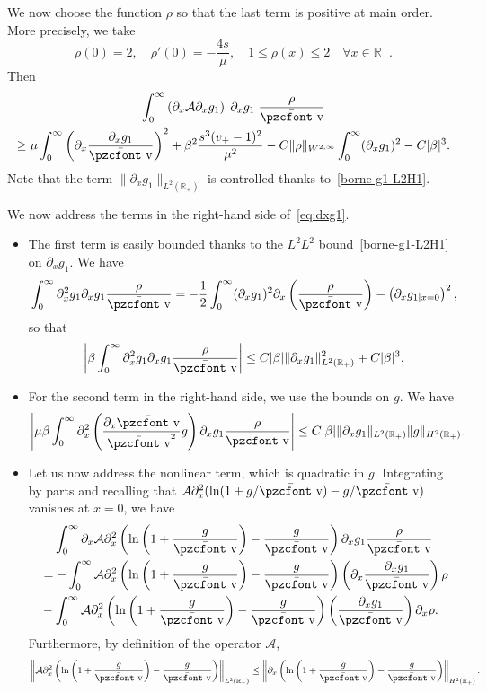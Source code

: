 \documentclass[10pt]{amsart}
\theoremstyle{definition}\newtheorem{defi}[theo]{Definition}\newtheorem{rema}[theo]{Remark}\newtheorem{exam}[theo]{Example}\newtheorem{exem}[theo]{Example}\newtheorem{nota}[theo]{Notation}
\newcommand{\mathpzc}[1]{\text{\pzcfont #1}}
\newcommand{\R}{\mathbb{R}}
\newcommand{\p}{\partial}
\newcommand{\bv}{\bar{\mathpzc{v}}}
\newcommand{\cA}{\mathcal A}
\let\oldforall\forall
\renewcommand*{\forall}{\mathrel{\oldforall}}
\begin{document}
We now choose the function $\rho$ so that the last term is positive at main order. More precisely, we take
\[
\rho(0)=2,\quad \rho'(0)=-\frac{4s}{\mu},\quad 1\leq \rho(x)\leq 2\quad \forall x\in \R_+.
\]
Then
\begin{multline}\label{eq:diffu_pxg1}
\int_0^\infty \left(\p_x \cA \p_x g_1\right) \;\p_x g_1 \; \frac{\rho}{\bv }\\
\geq \mu \int_0^\infty \left(\p_x \frac{\p_x g_1}{\bv}\right)^2 + \beta^2\frac{s^3(v_+-1)^2}{\mu^2} - C \|\rho\|_{W^{2,\infty}}\int_0^\infty (\p_x g_1)^2 - C|\beta|^3.
\end{multline}
Note that the term $\|\p_x g_1\|_{L^2(\mathbb R_+)}$ is controlled thanks to~\eqref{borne-g1-L2H1}.


We now address the terms in the right-hand side of~\eqref{eq:dxg1}.
\begin{itemize}
\item The first term is easily bounded thanks to the $L^2 L^2$ bound~\eqref{borne-g1-L2H1} on $\p_x g_1$. We have
\[
\int_0^\infty \p_x^2 g_1 \p_x g_1 \frac{\rho}{\bv} = -\frac{1}{2}\int_0^\infty(\p_x g_1)^2 \p_x\left(\frac{\rho}{\bv}\right)-\left(\p_x g_{1|x=0}\right)^2,
\]
so that
\[
\left| \beta \int_0^\infty \p_x^2 g_1 \p_x g_1 \frac{\rho}{\bv}\right|
\leq C |\beta| \|\p_x g_1\|_{L^2(\R_+)}^2 + C |\beta|^3.
\]


\item For the second term in the right-hand side, we use the bounds on $g$. We have
\[
\left|\mu \beta \int_0^\infty \p_x^2\left(\frac{\p_x \bv}{\bv^2} g\right) \p_x g_1 \frac{\rho}{\bv}\right|\leq C |\beta|\|\p_x g_1\|_{L^2(\R_+)}\|g\|_{H^2(\R_+)}.
\]

\item Let us now address the nonlinear term, which is quadratic in $g$. Integrating by parts and recalling that $\cA\p_x^2 (\ln(1+g/\bv)- g/\bv)$ vanishes at $x=0$, we have
\begin{multline*}
 \int_0^\infty \p_x \cA \p_x^2 \left(\ln\left(1+ \frac{g}{\bv}\right) - \frac{g}{\bv}\right) \p_x g_1 \frac{\rho }{\bv}\\
\begin{aligned}
&= - \int_0^\infty \cA \p_x^2 \left(\ln\left(1+ \frac{g}{\bv}\right) - \frac{g}{\bv}\right)\left(\p_x \frac{\p_x g_1}{\bv}\right) \rho\\
&- \int_0^\infty \cA \p_x^2 \left(\ln\left(1+ \frac{g}{\bv}\right) - \frac{g}{\bv}\right)\left(\frac{\p_x g_1}{\bv}\right) \p_x \rho.
\end{aligned}
\end{multline*}
Furthermore, by definition of the operator $\cA$,
\[
\left\| \cA \p_x^2 \left(\ln\left(1+ \frac{g}{\bv}\right) - \frac{g}{\bv}\right)\right\|_{L^2(\mathbb R_+)}
\leq \left\| \p_x \left(\ln\left(1+ \frac{g}{\bv}\right) - \frac{g}{\bv}\right)\right\|_{H^2(\R_+)}.
\]


\end{itemize}
\end{document}
